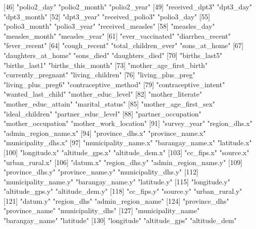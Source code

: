  [46] "polio2_day"                "polio2_month"              "polio2_year"              
 [49] "received_dpt3"             "dpt3_day"                  "dpt3_month"               
 [52] "dpt3_year"                 "received_polio3"           "polio3_day"               
 [55] "polio3_month"              "polio3_year"               "received_measles"         
 [58] "measles_day"               "measles_month"             "measles_year"             
 [61] "ever_vaccinated"           "diarrhea_recent"           "fever_recent"             
 [64] "cough_recent"              "total_children_ever"       "sons_at_home"             
 [67] "daughters_at_home"         "sons_died"                 "daughters_died"           
 [70] "births_last5"              "births_last1"              "births_this_month"        
 [73] "mother_age_first_birth"    "currently_pregnant"        "living_children"          
 [76] "living_plus_preg"          "living_plus_preg6"         "contraceptive_method"     
 [79] "contraceptive_intent"      "wanted_last_child"         "mother_educ_level"        
 [82] "mother_literate"           "mother_educ_attain"        "marital_status"           
 [85] "mother_age_first_sex"      "ideal_children"            "partner_educ_level"       
 [88] "partner_occupation"        "mother_occupation"         "mother_work_location"     
 [91] "survey_year"               "region_dhs.x"              "admin_region_name.x"      
 [94] "province_dhs.x"            "province_name.x"           "municipality_dhs.x"       
 [97] "municipality_name.x"       "barangay_name.x"           "latitude.x"               
[100] "longitude.x"               "altitude_gps.x"            "altitude_dem.x"           
[103] "cc_fips.x"                 "source.x"                  "urban_rural.x"            
[106] "datum.x"                   "region_dhs.y"              "admin_region_name.y"      
[109] "province_dhs.y"            "province_name.y"           "municipality_dhs.y"       
[112] "municipality_name.y"       "barangay_name.y"           "latitude.y"               
[115] "longitude.y"               "altitude_gps.y"            "altitude_dem.y"           
[118] "cc_fips.y"                 "source.y"                  "urban_rural.y"            
[121] "datum.y"                   "region_dhs"                "admin_region_name"        
[124] "province_dhs"              "province_name"             "municipality_dhs"         
[127] "municipality_name"         "barangay_name"             "latitude"                 
[130] "longitude"                 "altitude_gps"              "altitude_dem"             
